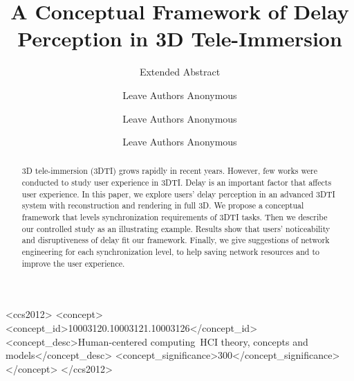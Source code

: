 \documentclass[sigchi, review]{acmart}
\begin{document}
\begin{CJK*}{UTF8}{gbsn}

\title{A Conceptual Framework of Delay Perception in 3D Tele-Immersion}

\subtitle{Extended Abstract}

\author{Leave Authors Anonymous}

\author{Leave Authors Anonymous}

\author{Leave Authors Anonymous}

\renewcommand{\shortauthors}{B. Trovato et al.}

\begin{abstract}

3D tele-immersion (3DTI) grows rapidly in recent years. However, few works were conducted to study user experience in 3DTI. Delay is an important factor that affects user experience. In this paper, we explore users' delay perception in an advanced 3DTI system with reconstruction and rendering in full 3D. We propose a conceptual framework that levels synchronization requirements of 3DTI tasks. Then we describe our controlled study as an illustrating example. Results show that users' noticeability and disruptiveness of delay fit our framework. Finally, we give suggestions of network engineering for each synchronization level, to help saving network resources and to improve the user experience.

\end{abstract}

%
%
\begin{CCSXML}
<ccs2012>
<concept>
<concept_id>10003120.10003121.10003126</concept_id>
<concept_desc>Human-centered computing~HCI theory, concepts and models</concept_desc>
<concept_significance>300</concept_significance>
</concept>
</ccs2012>
\end{CCSXML}



\end{CJK*}
\end{document}
